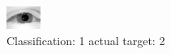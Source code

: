 \begin{figure}[h!]
\begin{center}
\includegraphics[width=0.60\columnwidth]{figures/ID2307_class_1_target_2.png}
\end{center}
\caption{ Classification: 1 actual target: 2}
\label{fig:ID2307_class_1_target_2}
\end{figure}
